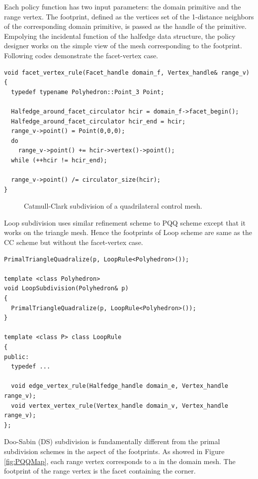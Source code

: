 \documentclass[letter,twoside,10pt]{article}
\begin{document}
Each policy function has two input parameters: the domain primitive
and the range vertex. The footprint, defined as the vertices set of
the 1-distance neighbors of the corresponding domain primitive, is
passed as the handle of the primitive. Empolying the incidental
function of the halfedge data structure, the policy designer works on
the simple view of the  mesh corresponding to the
footprint. Following codes demonstrate the facet-vertex case.

{\scriptsize
\begin{verbatim}
void facet_vertex_rule(Facet_handle domain_f, Vertex_handle& range_v) 
{
  typedef typename Polyhedron::Point_3 Point;

  Halfedge_around_facet_circulator hcir = domain_f->facet_begin();
  Halfedge_around_facet_circulator hcir_end = hcir;
  range_v->point() = Point(0,0,0);
  do 
    range_v->point() += hcir->vertex()->point();
  while (++hcir != hcir_end);

  range_v->point() /= circulator_size(hcir);
}
\end{verbatim}
}


\begin{figure}[htb]
    \caption{Catmull-Clark subdivision of a quadrilateral control mesh.}  
    \label{fig:cc}
\end{figure}

Loop subdivision uses similar refinement scheme to PQQ scheme except
that it works on the triangle mesh. Hence the footprints of Loop
scheme are same as the CC scheme but without the facet-vertex case.

{\scriptsize
\begin{verbatim}
PrimalTriangleQuadralize(p, LoopRule<Polyhedron>());

template <class Polyhedron>
void LoopSubdivision(Polyhedron& p) 
{ 
  PrimalTriangleQuadralize(p, LoopRule<Polyhedron>());
}

template <class P> class LoopRule 
{
public:
  typedef ...

  void edge_vertex_rule(Halfedge_handle domain_e, Vertex_handle range_v);
  void vertex_vertex_rule(Vertex_handle domain_v, Vertex_handle range_v);
};
\end{verbatim}
}

Doo-Sabin (DS) subdivision is fundamentally different from the primal
subdivision schemes in the aspect of the footprints. As showed in
Figure \ref{fig:PQQMap}, each range vertex corresponds to a
 in the domain mesh. The footprint of the range vertex
is the facet containing the corner.
\end{document}
